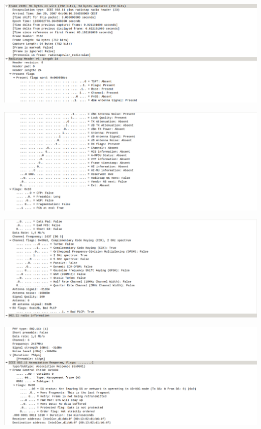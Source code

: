 \documentclass{article}
\begin{document}
\begin{center}
\includegraphics[scale=0.3]{WLAN/assres1.png}
\end{center}
\begin{center}
\includegraphics[scale=0.3]{WLAN/assres2.png}
\end{center}
\begin{center}
\includegraphics[scale=0.3]{WLAN/assres3.png}
\end{center}
\begin{center}
\includegraphics[scale=0.3]{WLAN/assres4.png}
\end{center}
\end{document}
